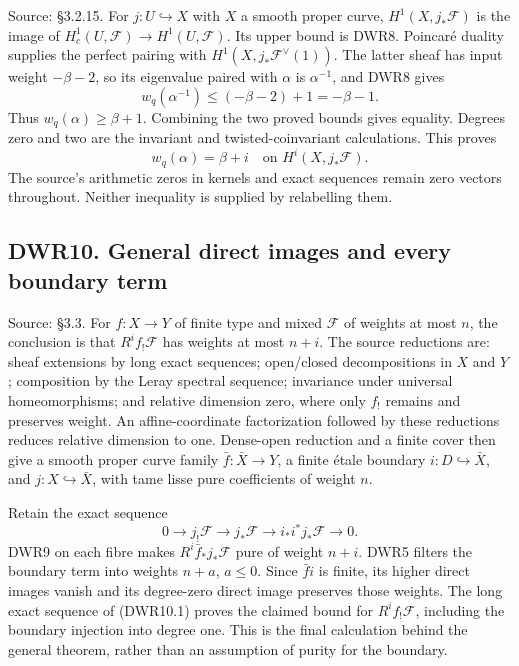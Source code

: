 Source: §3.2.15. For \(j:U\hookrightarrow X\) with \(X\) a smooth proper
curve, \(H^1(X,j_*\mathcal F)\) is the image of
\(H_c^1(U,\mathcal F)\to H^1(U,\mathcal F)\). Its upper bound is DWR8.
Poincaré duality supplies the perfect pairing with
\(H^1(X,j_*\mathcal F^\vee(1))\). The latter sheaf has input weight
\(-\beta-2\), so its eigenvalue paired with \(\alpha\) is
\(\alpha^{-1}\), and DWR8 gives \[
w_q(\alpha^{-1})\le(-\beta-2)+1=-\beta-1.
\tag{DWR9.1}
\] Thus \(w_q(\alpha)\ge\beta+1\). Combining the two proved bounds gives
equality. Degrees zero and two are the invariant and twisted-coinvariant
calculations. This proves \[
w_q(\alpha)=\beta+i
\quad\text{on }H^i(X,j_*\mathcal F).
\tag{DWR9.2}
\] The source's arithmetic zeros in kernels and exact sequences remain
zero vectors throughout. Neither inequality is supplied by relabelling
them.

\subsection{DWR10. General direct images and every boundary
term}\label{dwr10.-general-direct-images-and-every-boundary-term}

Source: §3.3. For \(f:X\to Y\) of finite type and mixed \(\mathcal F\)
of weights at most \(n\), the conclusion is that \(R^if_!\mathcal F\)
has weights at most \(n+i\). The source reductions are: sheaf extensions
by long exact sequences; open/closed decompositions in \(X\) and \(Y\);
composition by the Leray spectral sequence; invariance under universal
homeomorphisms; and relative dimension zero, where only \(f_!\) remains
and preserves weight. An affine-coordinate factorization followed by
these reductions reduces relative dimension to one. Dense-open reduction
and a finite cover then give a smooth proper curve family
\(\bar f:\bar X\to Y\), a finite étale boundary
\(i:D\hookrightarrow\bar X\), and \(j:X\hookrightarrow\bar X\), with
tame lisse pure coefficients of weight \(n\).

Retain the exact sequence \[
0\to j_!\mathcal F\to j_*\mathcal F\to i_*i^*j_*\mathcal F\to0.
\tag{DWR10.1}
\] DWR9 on each fibre makes \(R^i\bar f_*j_*\mathcal F\) pure of weight
\(n+i\). DWR5 filters the boundary term into weights \(n+a\), \(a\le0\).
Since \(\bar f i\) is finite, its higher direct images vanish and its
degree-zero direct image preserves those weights. The long exact
sequence of (DWR10.1) proves the claimed bound for \(R^if_!\mathcal F\),
including the boundary injection into degree one. This is the final
calculation behind the general theorem, rather than an assumption of
purity for the boundary.

